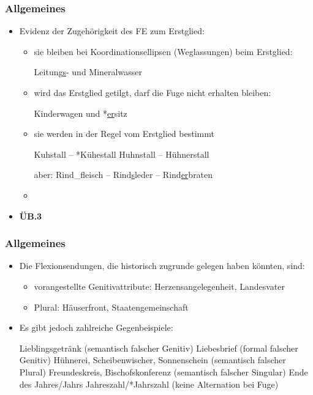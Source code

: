 \begin{frame}
\frametitle{Allgemeines}

\begin{itemize}
	\item Evidenz der Zugehörigkeit des FE zum Erstglied:
	
	\begin{itemize}
		\item sie bleiben bei Koordinationsellipsen (Weglassungen) beim Erstglied:
		
		\ea Leitung\underline{s}- und Mineralwasser
		\z
		
		\item wird das Erstglied getilgt, darf die Fuge nicht erhalten bleiben:
		
		\ea Kinderwagen und *\underline{er}sitz
		\z
		
		\item sie werden in der Regel vom Erstglied bestimmt
		
		\ea Kuhstall – *Kühestall \vs *Huhnstall – Hühnerstall
		\z
		
		\ea aber: Rind\_fleisch – Rind\underline{s}leder – Rind\underline{er}braten
		\z
		
		\item[]
	\end{itemize}
	\item[] \textbf{ÜB.3}
\end{itemize}


\end{frame}


\begin{frame}
\frametitle{Allgemeines}

\begin{itemize}
	\item Die Flexionsendungen, die historisch zugrunde gelegen haben könnten, sind:
	
	\begin{itemize}
		\item vorangestellte Genitivattribute: Herzensangelegenheit, Landesvater
		\item Plural: Häuserfront, Staatengemeinschaft
	\end{itemize}
	
	\item Es gibt jedoch zahlreiche Gegenbeispiele:
	
	\eal 
		\ex Lieblingsgetränk (semantisch falscher Genitiv)
		\ex Liebesbrief (formal falscher Genitiv)
		\ex Hühnerei, Scheibenwischer, Sonnenschein (semantisch falscher Plural)
		\ex Freundeskreis, Bischofskonferenz (semantisch falscher Singular)
		\ex Ende des Jahres/Jahrs \vs Jahreszahl/*Jahrszahl (keine Alternation bei Fuge)
	\zl
		 
\end{itemize}


\end{frame}


